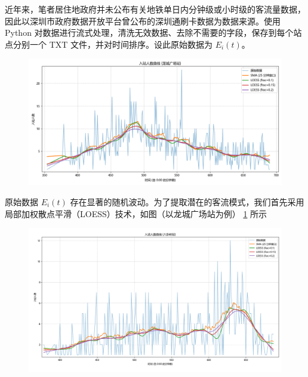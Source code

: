 

近年来，笔者居住地政府并未公布有关地铁单日内分钟级或小时级的客流量数据，因此以深圳市政府数据开放平台曾公布的深圳通刷卡数据为数据来源。使用 Python 对数据进行流式处理，清洗无效数据、去除不需要的字段，保存到每个站点分别一个 TXT 文件，并对时间排序。设此原始数据为 $E_i(t)$。

\begin{figure}[htbp]
    \centering
    \includegraphics[width=1.0\textwidth]{res/Figure_1.png}
    \label{fig:entryCurveLongcheng}
\end{figure}

原始数据 $E_i(t)$ 存在显著的随机波动。为了提取潜在的客流模式，我们首先采用局部加权散点平滑（LOESS）\cite{1979LOESS}\cite{1988LOESS}技术，如图（以龙城广场站为例） \ref{fig:entryCurveLongcheng} 所示

\begin{figure}[htbp]
    \centering
    \includegraphics[width=1.0\textwidth]{res/Figure_2.png}
    \label{fig:entryCurveBagualing}
\end{figure}

